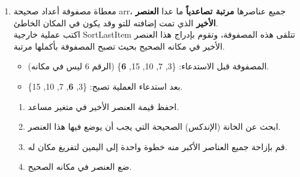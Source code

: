 \documentclass[14pt]{extarticle}
\begin{document}
\begin{enumerate}[itemsep=2em]
    \begin{boxHint}
     اتبع نفس الخطوات السابقة، لكن بدلاً من تلقي المؤشر \textenglish{idx}، ابحث عن المكان الصحيح له أولاً من خلال حلقة، ثم قم بعملية الإزاحة والإدراج.
     \end{boxHint}

    \ifwithsols
    \begin{boxSolution}
    \begin{english}
    \begin{verbatim}
public static void InsertInSortedArray(int[] arr, int val)
{
    int idx = 0;
    while (idx < arr.Length && arr[idx] < val)
    {
        idx++;
    }
    for(int i = arr.Length - 2; i >= idx; i--)
    {
        arr[i + 1] = arr[i];
    }
    arr[idx] = val;
}
    \end{verbatim}
    \end{english}
    \end{boxSolution}
    \fi

    \clearpage
\item
    معطاة مصفوفة أعداد صحيحة \textenglish{arr}، جميع عناصرها \textbf{مرتبة تصاعدياً} ما عدا \textbf{العنصر الأخير} الذي تمت إضافته للتو وقد يكون في المكان الخاطئ. \\
    اكتب عملية خارجية \textenglish{SortLastItem} تتلقى هذه المصفوفة، وتقوم بإدراج هذا العنصر الأخير في مكانه الصحيح بحيث تصبح المصفوفة بأكملها مرتبة.

    \begin{boxExample}
    \begin{itemize}
        \item المصفوفة قبل الاستدعاء: \textenglish{\{3, 7, 10, 15, \textbf{6}\}} (الرقم 6 ليس في مكانه).
        \item بعد استدعاء العملية تصبح: \textenglish{\{3, \textbf{6}, 7, 10, 15\}}.
    \end{itemize}
\end{boxExample}

    \begin{boxHint}
    \begin{enumerate}
        \item احفظ قيمة العنصر الأخير في متغير مساعد.
        \item ابحث عن الخانة (الإندكس) الصحيحة التي يجب أن يوضع فيها هذا العنصر.
        \item قم بإزاحة جميع العناصر الأكبر منه خطوة واحدة إلى اليمين لتفريغ مكان له.
        \item ضع العنصر في مكانه الصحيح.
    \end{enumerate}
\end{boxHint}



\end{enumerate}
\end{document}

